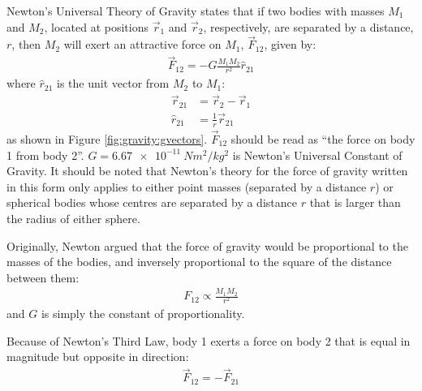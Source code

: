 Newton's Universal Theory of Gravity states that if two bodies with masses $M_1$ and $M_2$, located at positions $\vec r_1$ and $\vec r_2$, respectively, are separated by a distance, $r$, then $M_2$ will exert an attractive force on $M_1$, $\vec F_{12}$, given by:
\begin{align}
\vec F_{12}=-G\frac{M_1M_2}{r^2}\hat r_{21}
\end{align}
where $\hat r_{21}$ is the unit vector from $M_2$ to $M_1$:
\begin{align*}
\vec r_{21} &= \vec r_2 - \vec r_1\\
\hat r_{21} &= \frac{1}{r} \vec r_{21}
\end{align*}
as shown in Figure \ref{fig:gravity:gvectors}. $\vec F_{12}$ should be read as ``the force on body 1 from body 2''. $G=\SI{6.67e-11}{Nm^2/kg^2}$ is Newton's Universal Constant of Gravity. It should be noted that Newton's theory for the force of gravity written in this form only applies to either point masses (separated by a distance $r$) or spherical bodies whose centres are separated by a distance $r$ that is larger than the radius of either sphere.

Originally, Newton argued that the force of gravity would be proportional to the masses of the bodies, and inversely proportional to the square of the distance between them:
\begin{align*}
F_{12}\propto \frac{M_1M_2}{r^2}
\end{align*}
and $G$ is simply the constant of proportionality.

Because of Newton's Third Law, body 1 exerts a force on body 2 that is equal in magnitude but opposite in direction:
\begin{align*}
\vec F_{12} = -\vec F_{21}
\end{align*} 


